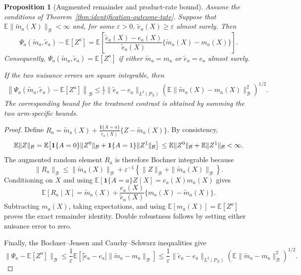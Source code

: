 \documentclass[10pt,a4paper]{amsart}
\newtheorem{proposition}{Proposition}
\begin{document}
\begin{proposition}[Augmented remainder and product-rate bound]
\label{prop:product-rate-bias}
Assume the conditions of Theorem~\ref{thm:identification-outcome-tate}. Suppose that \(\mathbb E\|\widetilde m_a(X)\|_{\mathcal B}<\infty\) and, for some
\(\varepsilon>0\), \(\widetilde e_a(X)\geq\varepsilon\) almost surely. Then
\[
\Psi_a(\widetilde m_a,\widetilde e_a)-\mathbb E[Z^a]
=
\mathbb E\left[
\frac{\widetilde e_a(X)-e_a(X)}
     {\widetilde e_a(X)}
\{\widetilde m_a(X)-m_a(X)\}
\right].
\]
Consequently,
\(\Psi_a(\widetilde m_a,\widetilde e_a)=\mathbb E[Z^a]\) if either
\(\widetilde m_a=m_a\) or \(\widetilde e_a=e_a\) almost surely.

If the two nuisance errors are square integrable, then
\[
\begin{aligned}
\left\|
\Psi_a(\widetilde m_a,\widetilde e_a)-\mathbb E[Z^a]
\right\|_{\mathcal B}
\leq
\frac{1}{\varepsilon}
\|\widetilde e_a-e_a\|_{L^2(P_X)}
\left(
\mathbb E
\|\widetilde m_a(X)-m_a(X)\|_{\mathcal B}^{2}
\right)^{1/2}.
\end{aligned}
\]
The corresponding bound for the treatment contrast is obtained by summing the two arm-specific bounds.
\end{proposition}

\begin{proof}
Define \(R_a = \widetilde m_a(X) + \frac{\mathbf 1\{A=a\}}{\widetilde e_a(X)} \{Z-\widetilde m_a(X)\}\). By consistency,
\[
\mathbb E\|Z\|_{\mathcal B}
=
\mathbb E\!\left[
\mathbf 1\{A=0\}\|Z^0\|_{\mathcal B}
+
\mathbf 1\{A=1\}\|Z^1\|_{\mathcal B}
\right] \\
\leq
\mathbb E\|Z^0\|_{\mathcal B}
+
\mathbb E\|Z^1\|_{\mathcal B}
<\infty.
\]
The augmented random element \(R_a\) is therefore Bochner integrable because
\[
\|R_a\|_{\mathcal B}
\leq
\|\widetilde m_a(X)\|_{\mathcal B}
+
\varepsilon^{-1}
\left\{
\|Z\|_{\mathcal B}
+
\|\widetilde m_a(X)\|_{\mathcal B}
\right\}.
\]
Conditioning on \(X\) and using
\(\mathbb E[\mathbf 1\{A=a\}Z\mid X]=e_a(X)m_a(X)\) gives
\[
\mathbb E[R_a\mid X]
=
\widetilde m_a(X)
+
\frac{e_a(X)}{\widetilde e_a(X)}
\{m_a(X)-\widetilde m_a(X)\}.
\]
Subtracting \(m_a(X)\), taking expectations, and using
\(\mathbb E[m_a(X)]=\mathbb E[Z^a]\) proves the exact remainder identity. Double robustness follows by setting either nuisance error to zero.

Finally, the Bochner--Jensen and Cauchy--Schwarz inequalities give
\[
\|\Psi_a-\mathbb E[Z^a]\|_{\mathcal B}
\leq
\frac{1}{\varepsilon}
\mathbb E\left[
|\widetilde e_a-e_a|
\|\widetilde m_a-m_a\|_{\mathcal B}
\right] 
\leq
\frac{1}{\varepsilon}
\|\widetilde e_a-e_a\|_{L^2(P_X)}
\left(
\mathbb E\|\widetilde m_a-m_a\|_{\mathcal B}^{2}
\right)^{1/2}.
\]
\end{proof}
\end{document}
